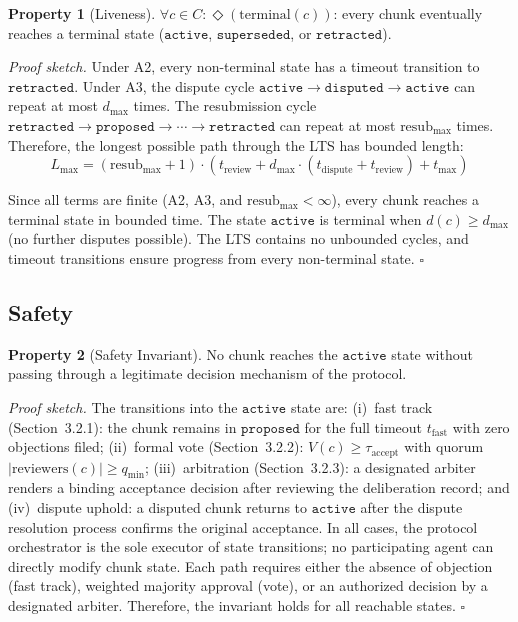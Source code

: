 \documentclass[11pt]{article}
\begin{document}
\textbf{Property 1} (Liveness). $\forall c \in C: \Diamond(\text{terminal}(c))$: every chunk eventually reaches a terminal state ($\texttt{active}$, $\texttt{superseded}$, or $\texttt{retracted}$).

\textit{Proof sketch.} Under A2, every non-terminal state has a timeout transition to $\texttt{retracted}$. Under A3, the dispute cycle $\texttt{active} \rightarrow \texttt{disputed} \rightarrow \texttt{active}$ can repeat at most $d_{\max}$ times. The resubmission cycle $\texttt{retracted} \rightarrow \texttt{proposed} \rightarrow \cdots \rightarrow \texttt{retracted}$ can repeat at most $\text{resub}_{\max}$ times. Therefore, the longest possible path through the LTS has bounded length:
\[
L_{\max} = (\text{resub}_{\max} + 1) \cdot \left( t_{\text{review}} + d_{\max} \cdot (t_{\text{dispute}} + t_{\text{review}}) + t_{\max} \right)
\]

Since all terms are finite (A2, A3, and $\text{resub}_{\max} < \infty$), every chunk reaches a terminal state in bounded time. The state $\texttt{active}$ is terminal when $d(c) \geq d_{\max}$ (no further disputes possible). The LTS contains no unbounded cycles, and timeout transitions ensure progress from every non-terminal state. $\square$

\subsection{Safety}

\textbf{Property 2} (Safety Invariant). No chunk reaches the $\texttt{active}$ state without passing through a legitimate decision mechanism of the protocol.

\textit{Proof sketch.} The transitions into the $\texttt{active}$ state are: (i)~fast track (Section~3.2.1): the chunk remains in $\texttt{proposed}$ for the full timeout $t_{\text{fast}}$ with zero objections filed; (ii)~formal vote (Section~3.2.2): $V(c) \geq \tau_{\text{accept}}$ with quorum $|\text{reviewers}(c)| \geq q_{\min}$; (iii)~arbitration (Section~3.2.3): a designated arbiter renders a binding acceptance decision after reviewing the deliberation record; and (iv)~dispute uphold: a disputed chunk returns to $\texttt{active}$ after the dispute resolution process confirms the original acceptance. In all cases, the protocol orchestrator is the sole executor of state transitions; no participating agent can directly modify chunk state. Each path requires either the absence of objection (fast track), weighted majority approval (vote), or an authorized decision by a designated arbiter. Therefore, the invariant holds for all reachable states. $\square$
\end{document}
